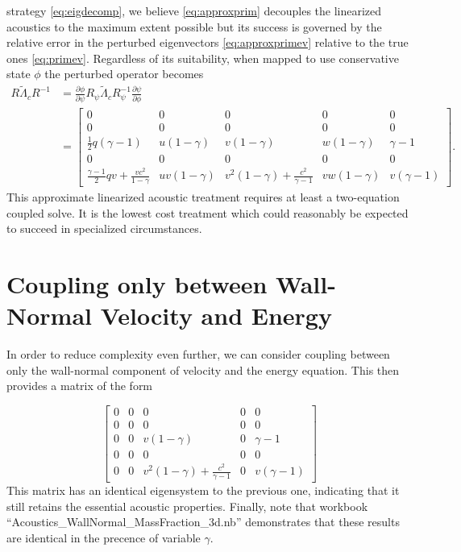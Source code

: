 \documentclass[letterpaper,11pt,nointlimits,reqno]{amsart}
\begin{document}
strategy \eqref{eq:eigdecomp}, we believe \eqref{eq:approxprim} decouples the
linearized acoustics to the maximum extent possible but its success is governed
by the relative error in the perturbed eigenvectors \eqref{eq:approxprimev}
relative to the true ones \eqref{eq:primev}.  Regardless of its suitability,
when mapped to use conservative state $\phi$ the perturbed operator becomes
\begin{align}
  R \tilde\Lambda_c R^{-1}
  &=
  \frac{\partial \phi}{\partial \psi}
  R_\psi \tilde\Lambda_c R_\psi^{-1}
  \frac{\partial \psi}{\partial \phi}
\\
 &=
\begin{bmatrix}
 0 & 0 & 0 & 0 & 0 \\
 0 & 0 & 0 & 0 & 0 \\
 \frac{1}{2} q (\gamma-1) & u(1-\gamma)  & v(1-\gamma)  & w(1-\gamma)  & \gamma-1  \\
 0 & 0 & 0 & 0 & 0 \\
 \frac{\gamma-1}{2} q v +\frac{v c^2}{1-\gamma} & u v (1-\gamma ) & v^2 (1-\gamma)+\frac{c^2}{\gamma-1} & v w (1-\gamma ) & v (\gamma-1 )
\end{bmatrix}
.
\end{align}
This approximate linearized acoustic treatment requires at least a two-equation
coupled solve.  It is the lowest cost treatment which could reasonably be
expected to succeed in specialized circumstances.

\section{Coupling only between Wall-Normal Velocity and Energy}

In order to reduce complexity even further, we can consider coupling between only the wall-normal 
component of velocity and the energy equation. This then provides a matrix of the form

\begin{equation}\label{eq:reduced}
 \begin{bmatrix}
 0 & 0 & 0 & 0 & 0 \\
 0 & 0 & 0 & 0 & 0 \\
 0 & 0 & v(1-\gamma)  & 0 & \gamma-1  \\
 0 & 0 & 0 & 0 & 0 \\
 0 & 0 & v^2 (1-\gamma)+\frac{c^2}{\gamma-1} & 0 & v (\gamma-1 )
\end{bmatrix}
\end{equation}
This matrix has an identical eigensystem to the previous one, indicating that it still retains the essential acoustic properties. 
Finally, note that workbook ``Acoustics\_WallNormal\_MassFraction\_3d.nb'' demonstrates that these results are identical in the precence of 
variable $\gamma$. 
\end{document}
